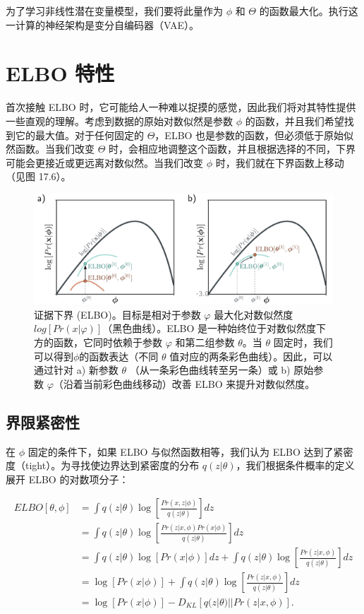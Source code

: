 为了学习非线性潜在变量模型，我们要将此量作为 \(\phi\) 和 \(\Theta\) 的函数最大化。执行这一计算的神经架构是变分自编码器（VAE）。

\section{ELBO 特性 }
首次接触 ELBO 时，它可能给人一种难以捉摸的感觉，因此我们将对其特性提供一些直观的理解。考虑到数据的原始对数似然是参数 \(\phi\) 的函数，并且我们希望找到它的最大值。对于任何固定的 \(\Theta\)，ELBO 也是参数的函数，但必须低于原始似然函数。当我们改变 \(\Theta\) 时，会相应地调整这个函数，并且根据选择的不同，下界可能会更接近或更远离对数似然。当我们改变 \(\phi\) 时，我们就在下界函数上移动（见图 17.6）。

\begin{figure}[ht!]
\centering
\includegraphics[width=0.7\linewidth]{png/chapter17/VAEELBO.png}
\caption{证据下界 (ELBO)。目标是相对于参数 \(\varphi\) 最大化对数似然度 \(log[Pr(x|\varphi)]\)（黑色曲线）。ELBO 是一种始终位于对数似然度下方的函数，它同时依赖于参数 \(\varphi\) 和第二组参数 \(\theta\)。当 \(\theta\) 固定时，我们可以得到\(\phi\)的函数表达（不同 \(\theta\) 值对应的两条彩色曲线）。因此，可以通过针对 a) 新参数  \(\theta\) （从一条彩色曲线转至另一条）或 b) 原始参数 \(\varphi\)（沿着当前彩色曲线移动）改善 ELBO 来提升对数似然度。}
\end{figure}


\subsection{界限紧密性}
在 \(\phi\) 固定的条件下，如果 ELBO 与似然函数相等，我们认为 ELBO 达到了紧密度（tight）。为寻找使边界达到紧密度的分布 \(q(z|\theta)\)，我们根据条件概率的定义展开 ELBO 的对数项分子：


\begin{align}
ELBO[\theta, \phi] &= \int q(z|\theta) \log \left[ \frac{Pr(x, z|\phi)}{q(z|\theta)} \right] dz \\
&= \int q(z|\theta) \log \left[ \frac{Pr(z|x, \phi)Pr(x|\phi)}{q(z|\theta)} \right] dz \\
&= \int q(z|\theta) \log [Pr(x|\phi)] dz + \int q(z|\theta) \log \left[ \frac{Pr(z|x, \phi)}{q(z|\theta)} \right] dz \\
&= \log [Pr(x|\phi)] + \int q(z|\theta) \log \left[ \frac{Pr(z|x, \phi)}{q(z|\theta)} \right] dz \\
&= \log [Pr(x|\phi)] - D_{KL} \left[ q(z|\theta) || Pr(z|x, \phi) \right]. 
\end{align} 


